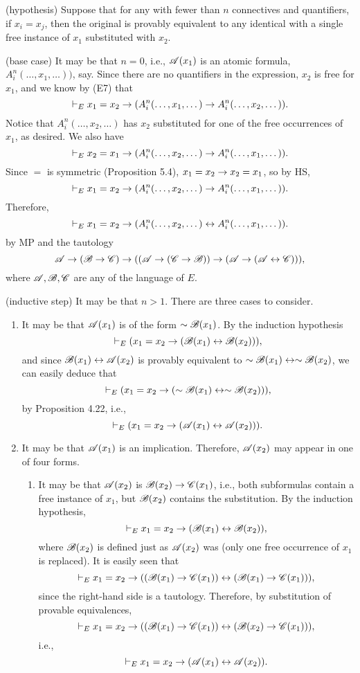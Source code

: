 \begin{enumerate}
    (hypothesis) Suppose that for any \wf{} with fewer than \(n\) connectives and quantifiers, if \(x_i = x_j\), then the original \wf{} is provably equivalent to any identical \wf{} with a single free instance of \(x_1\) substituted with \(x_2\).

    (base case) It may be that \(n=0\), i.e., \(\mathscr{A}(x_1)\) is an atomic formula, \(A^n_i(\dots, x_1, \dots))\), say. Since there are no quantifiers in the expression, \(x_2\) is free for \(x_1\), and we know by (E7) that
    \[\vdash_{E} x_1 = x_2 \rightarrow (A^n_i(\dots, x_1, \dots) \rightarrow A^n_i(\dots, x_2, \dots)).\]
    Notice that \(A^n_i(\dots, x_2, \dots)\) has \(x_2\) substituted for one of the free occurrences of \(x_1\), as desired. We also have
    \[\vdash_{E} x_2 = x_1 \rightarrow (A^n_i(\dots, x_2, \dots) \rightarrow A^n_i(\dots, x_1, \dots)).\]
    Since \(=\) is symmetric (Proposition 5.4), \(x_1 = x_2 \rightarrow x_2 = x_1\), so by HS,
    \[\vdash_{E} x_1 = x_2 \rightarrow (A^n_i(\dots, x_2, \dots) \rightarrow A^n_i(\dots, x_1, \dots)).\]
    Therefore,
    \[\vdash_{E} x_1 = x_2 \rightarrow (A^n_i(\dots, x_2, \dots) \leftrightarrow A^n_i(\dots, x_1, \dots)).\]
    by MP and the tautology
    \[\mathscr{A} \rightarrow (\mathscr{B} \rightarrow \mathscr{C}) \rightarrow ((\mathscr{A} \rightarrow (\mathscr{C} \rightarrow \mathscr{B})) \rightarrow (\mathscr{A} \rightarrow (\mathscr{A} \leftrightarrow \mathscr{C}))),\]
    where \(\mathscr{A}, \mathscr{B}, \mathscr{C}\) are any \wfs{} of the language of \(E\).

    (inductive step) It may be that \(n>1\). There are three cases to consider.
    \begin{enumerate}
      \item It may be that \(\mathscr{A}(x_1)\) is of the form \(\sim\mathscr{B}(x_1)\). By the induction hypothesis
        \[\vdash_{E} (x_1 = x_2 \rightarrow (\mathscr{B}(x_1) \leftrightarrow \mathscr{B}(x_2))),\]
        and since \(\mathscr{B}(x_1) \leftrightarrow \mathscr{A}(x_2)\) is provably equivalent to \(\sim\mathscr{B}(x_1) \leftrightarrow \sim\mathscr{B}(x_2)\), we can easily deduce that
        \[\vdash_{E} (x_1 = x_2 \rightarrow (\sim\mathscr{B}(x_1) \leftrightarrow \sim\mathscr{B}(x_2))),\]
        by Proposition 4.22, i.e.,
        \[\vdash_{E} (x_1 = x_2 \rightarrow (\mathscr{A}(x_1) \leftrightarrow \mathscr{A}(x_2))).\]

      \item It may be that \(\mathscr{A}(x_1)\) is an implication. Therefore, \(\mathscr{A}(x_2)\) may appear in one of four forms. 
        \begin{enumerate}
          \item It may be that \(\mathscr{A}(x_2)\) is \(\mathscr{B}(x_2) \rightarrow \mathscr{C}(x_1)\), i.e., both subformulas contain a free instance of \(x_1\), but \(\mathscr{B}(x_2)\) contains the substitution. By the induction hypothesis,
            \[\vdash_{E} x_1 = x_2 \rightarrow (\mathscr{B}(x_1) \leftrightarrow \mathscr{B}(x_2)),\]
            where \(\mathscr{B}(x_2)\) is defined just as \(\mathscr{A}(x_2)\) was (only one free occurrence of \(x_1\) is replaced). It is easily seen that
            \[\vdash_{E} x_1 = x_2 \rightarrow ((\mathscr{B}(x_1) \rightarrow \mathscr{C}(x_1)) \leftrightarrow (\mathscr{B}(x_1) \rightarrow \mathscr{C}(x_1))),\]
            since the right-hand side is a tautology. Therefore, by substitution of provable equivalences,
            \[\vdash_{E} x_1 = x_2 \rightarrow ((\mathscr{B}(x_1) \rightarrow \mathscr{C}(x_1)) \leftrightarrow (\mathscr{B}(x_2) \rightarrow \mathscr{C}(x_1))),\]
            i.e.,
            \[\vdash_{E} x_1 = x_2 \rightarrow (\mathscr{A}(x_1) \leftrightarrow \mathscr{A}(x_2)).\]


\end{enumerate}
\end{enumerate}
\end{enumerate}
